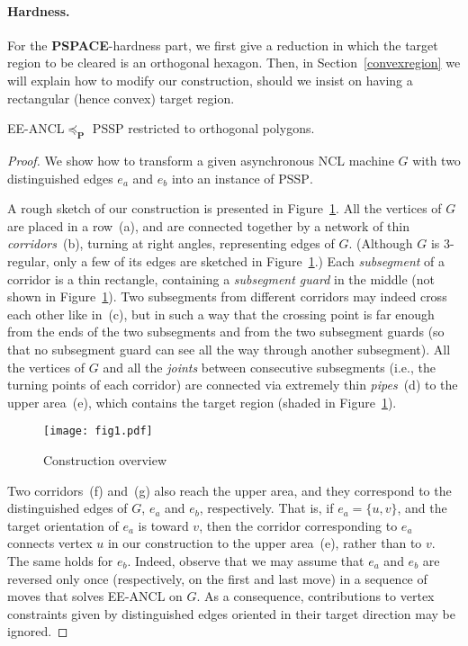 \documentclass{style}
\newcommand{\complexityclass}[1]{\textbf{#1}}
\newcommand{\computproblem}[1]{\textsc{#1}}
\renewcommand{\P}{\complexityclass{P}\xspace}
\newcommand{\PSPACE}{\complexityclass{PSPACE}\xspace}
\newcommand{\EEANCL}{\computproblem{EE-ANCL}\xspace}
\newcommand{\PSSP}{\computproblem{PSSP}\xspace}
\begin{document}
\paragraph{Hardness.}

For the \PSPACE-hardness part, we first give a reduction in which the target region to be cleared is an orthogonal hexagon. Then, in Section~\ref{convexregion} we will explain how to modify our construction, should we insist on having a rectangular (hence convex) target region.

\begin{lemma} \label{lemma2}
\EEANCL $\preceq_{\P}$ \PSSP restricted to orthogonal polygons.
\end{lemma}
\begin{proof}
We show how to transform a given asynchronous NCL machine $G$ with two distinguished edges $e_a$ and $e_b$ into an instance of \PSSP.

A rough sketch of our construction is presented in Figure~\ref{fig1}. All the vertices of $G$ are placed in a row~(a), and are connected together by a network of thin \emph{corridors}~(b), turning at right angles, representing edges of $G$. (Although $G$ is 3-regular, only a few of its edges are sketched in Figure~\ref{fig1}.)
Each \emph{subsegment} of a corridor is a thin rectangle, containing a \emph{subsegment guard} in the middle (not shown in Figure~\ref{fig1}). Two subsegments from different corridors may indeed cross each other like in~(c), but in such a way that the crossing point is far enough from the ends of the two subsegments and from the two subsegment guards (so that no subsegment guard can see all the way through another subsegment). All the vertices of $G$ and all the \emph{joints} between consecutive subsegments (i.e., the turning points of each corridor) are connected via extremely thin \emph{pipes}~(d) to the upper area~(e), which contains the target region (shaded in Figure~\ref{fig1}).

\begin{figure}[ht]
\centering
\texttt{[image: fig1.pdf]}
\caption{Construction overview}
\label{fig1}
\end{figure}

Two corridors~(f) and~(g) also reach the upper area, and they correspond to the distinguished edges of $G$, $e_a$ and $e_b$, respectively. That is, if $e_a=\{u,v\}$, and the target orientation of $e_a$ is toward $v$, then the corridor corresponding to $e_a$ connects vertex $u$ in our construction to the upper area~(e), rather than to $v$. The same holds for $e_b$. Indeed, observe that we may assume that $e_a$ and $e_b$ are reversed only once (respectively, on the first and last move) in a sequence of moves that solves \EEANCL on $G$. As a consequence, contributions to vertex constraints given by distinguished edges oriented in their target direction may be ignored.


\end{proof}
\end{document}
